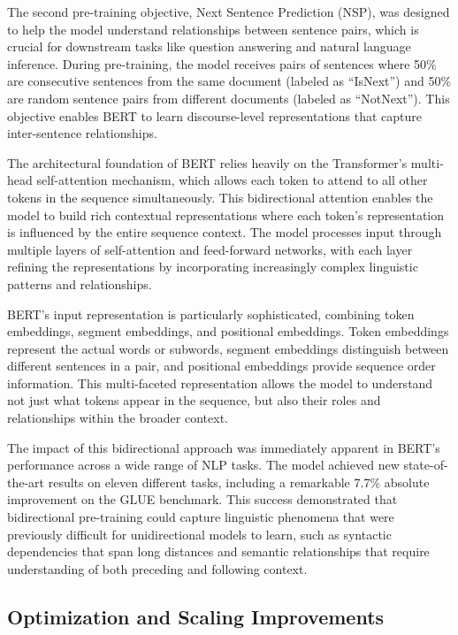 \documentclass[
  titlepage]{article}
\begin{document}
The second pre-training objective, Next Sentence Prediction (NSP), was
designed to help the model understand relationships between sentence
pairs, which is crucial for downstream tasks like question answering and
natural language inference. During pre-training, the model receives
pairs of sentences where 50\% are consecutive sentences from the same
document (labeled as ``IsNext'') and 50\% are random sentence pairs from
different documents (labeled as ``NotNext''). This objective enables
BERT to learn discourse-level representations that capture
inter-sentence relationships.

The architectural foundation of BERT relies heavily on the Transformer's
multi-head self-attention mechanism, which allows each token to attend
to all other tokens in the sequence simultaneously. This bidirectional
attention enables the model to build rich contextual representations
where each token's representation is influenced by the entire sequence
context. The model processes input through multiple layers of
self-attention and feed-forward networks, with each layer refining the
representations by incorporating increasingly complex linguistic
patterns and relationships.

BERT's input representation is particularly sophisticated, combining
token embeddings, segment embeddings, and positional embeddings. Token
embeddings represent the actual words or subwords, segment embeddings
distinguish between different sentences in a pair, and positional
embeddings provide sequence order information. This multi-faceted
representation allows the model to understand not just what tokens
appear in the sequence, but also their roles and relationships within
the broader context.

The impact of this bidirectional approach was immediately apparent in
BERT's performance across a wide range of NLP tasks. The model achieved
new state-of-the-art results on eleven different tasks, including a
remarkable 7.7\% absolute improvement on the GLUE benchmark. This
success demonstrated that bidirectional pre-training could capture
linguistic phenomena that were previously difficult for unidirectional
models to learn, such as syntactic dependencies that span long distances
and semantic relationships that require understanding of both preceding
and following context.

\subsection{Optimization and Scaling
Improvements}\label{optimization-and-scaling-improvements}
\end{document}
